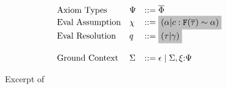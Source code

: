 \documentclass[format=acmsmall,manuscript,review,screen,nonacm,margin=1in,11pt]{acmart}
\begin{document}
\begin{figure}[ht]
\[\begin{array}{l l l l l}
      &\text{Axiom Types}     &\AxiomTy     &\bnfeq \many\AxiomEq\\
      &\text{Eval Assumption}   &\chi &\bnfeq \text{\shaded{$(\alpha|c : \FamCtrs(\many\tau) \teq \alpha)$}} \\
      &\text{Eval Resolution}   &q    &\bnfeq \text{\shaded{$(\tau|\Co)$}}\\      
      \\
      &\text{Ground Context} &\GEnv   &\bnfeq \empt \bnfor \GEnv,\Axiom\co\AxiomTy
    \end{array}
  \]
  \caption[\QLTF]{Excerpt of \QLTF}
  \label{fig:tf-constrained-system}
\end{figure}
\end{document}
